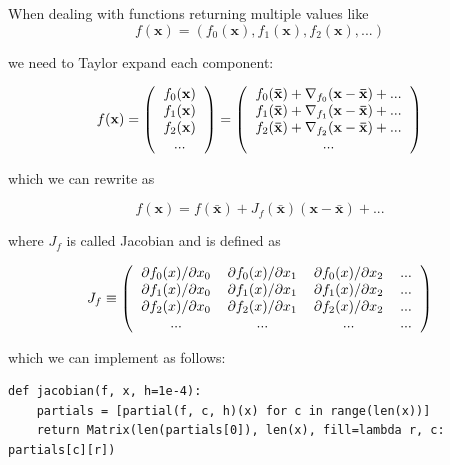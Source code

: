 \documentclass[justified, sixbynine]{tufte-book}
\def\ft{\small\tt}
\theoremstyle{plain}%
\newtheorem * {corollary}{Corollary}
\theoremstyle{definition}
\theoremstyle{remark}
\newtheorem * {remark}{Remark}
\newtheorem * {note}{Note}
\begin{document}
\begin{fullwidth}
When dealing with functions returning multiple values like
\begin{equation}
f(\mathbf{x}) = (f_0(\mathbf{x}), f_1(\mathbf{x}), f_2(\mathbf{x}), ...)
\end{equation}

we need to Taylor expand each component:

\begin{equation}
f(\mathbf{x}) =
\left(
\begin{tabular}{c}
$f_0(\mathbf{x})$ \\
$f_1(\mathbf{x})$ \\
$f_2(\mathbf{x})$ \\
...
\end{tabular}
\right) =
\left(
\begin{tabular}{c}
$f_0(\mathbf{\bar x}) + \nabla_{f_0}(\mathbf{x}-\mathbf{\bar x}) + ...$ \\
$f_1(\mathbf{\bar x}) + \nabla_{f_1}(\mathbf{x}-\mathbf{\bar x}) + ...$ \\
$f_2(\mathbf{\bar x}) + \nabla_{f_2}(\mathbf{x}-\mathbf{\bar x}) + ...$ \\
...
\end{tabular}
\right)
\end{equation}

which we can rewrite as

\begin{equation}
f(\mathbf{x}) = f(\mathbf{\bar x}) + J_f(\mathbf{\bar x})(\mathbf{x}-\mathbf{\bar x}) + ... \label{jacobian2}
\end{equation}

where $J_f$ is called Jacobian and is defined as

\begin{equation}
J_f \equiv
\left(
\begin{tabular}{cccc}
$\partial f_0(x)/\partial x_0$ &
$\partial f_0(x)/\partial x_1$ &
$\partial f_0(x)/\partial x_2$ &
... \\
$\partial f_1(x)/\partial x_0$ &
$\partial f_1(x)/\partial x_1$ &
$\partial f_1(x)/\partial x_2$ &
... \\
$\partial f_2(x)/\partial x_0$ &
$\partial f_2(x)/\partial x_1$ &
$\partial f_2(x)/\partial x_2$ &
... \\
... & ... & ... & ...
\end{tabular}
\right)
\end{equation}

which we can implement as follows:

\begin{lstlisting}[caption={in file: {\ft nlib.py}}]
def jacobian(f, x, h=1e-4):
    partials = [partial(f, c, h)(x) for c in range(len(x))]
    return Matrix(len(partials[0]), len(x), fill=lambda r, c: partials[c][r])
\end{lstlisting}


\end{fullwidth}
\end{document}
